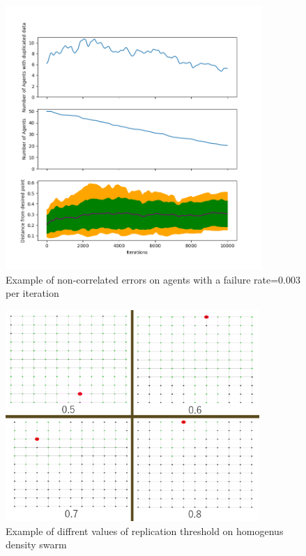\documentclass{UoYCSproject}
\begin{document}
\begin{figure}[htb]
\label{fig:Data5}
\begin{center}
\centering
\includegraphics[width=\linewidth, height=10cm]{"./Non_correlated_errors_test1.png"}
\caption{Example of non-correlated errors on agents with a failure rate=0.003 per iteration}
\end{center}
\end{figure}

\begin{figure}[htb]
\label{fig:Data6}
\begin{center}
\centering
\includegraphics[width=\linewidth, height=8cm]{"./Replication_No_Suicide_threshold_Together.png"}
\caption{Example of diffrent values of replication threshold on homogenus density swarm}
\end{center}
\end{figure}
\end{document}
